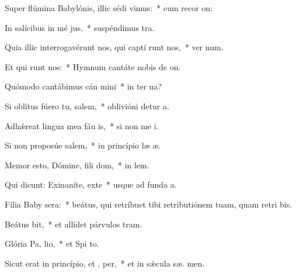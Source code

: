 \item Super flúmina Babylónis, illic sédi  vimus:~* cum recor on:
\item In salícibus in mé jus,~* suspéndimus  tra.
\item Quia illic interrogavérunt nos, qui captí runt nos,~* ver num.
\item Et qui runt nos:~* Hymnum cantáte nobis de  on.
\item Quómodo cantábimus cán mini~* in ter na?
\item Si oblítus fúero tu, salem,~* oblivióni detur  a.
\item Adhǽreat lingua mea fáu is,~* si non me i.
\item Si non proposúe salem,~* in princípio læ æ.
\item Memor esto, Dómine, fili dom,~* in  lem.
\item Qui dicunt: Exinaníte, exte~* usque ad funda  a.
\item Fília Baby sera:~* beátus, qui retríbuet tibi retributiónem tuam, quam retri bis.
\item Beátus  bit,~* et allídet párvulos   tram.
\item Glória Pa,  lio,~* et Spi to.
\item Sicut erat in princípio, et ,  per,~* et in sǽcula sæ. men.
